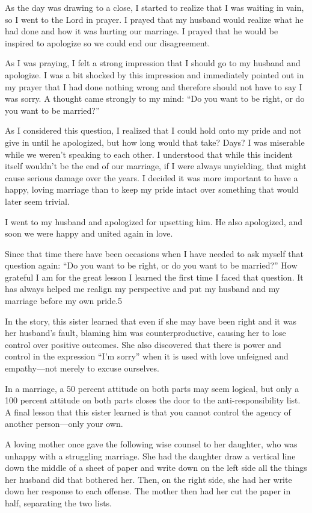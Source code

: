 \documentclass[letterpaper, 11pt]{report}
\begin{document}
As the day was drawing to a close, I started to realize that I was waiting in vain, so I went to the Lord in prayer. I prayed that my husband would realize what he had done and how it was hurting our marriage. I prayed that he would be inspired to apologize so we could end our disagreement.

As I was praying, I felt a strong impression that I should go to my husband and apologize. I was a bit shocked by this impression and immediately pointed out in my prayer that I had done nothing wrong and therefore should not have to say I was sorry. A thought came strongly to my mind: “Do you want to be right, or do you want to be married?”

As I considered this question, I realized that I could hold onto my pride and not give in until he apologized, but how long would that take? Days? I was miserable while we weren’t speaking to each other. I understood that while this incident itself wouldn’t be the end of our marriage, if I were always unyielding, that might cause serious damage over the years. I decided it was more important to have a happy, loving marriage than to keep my pride intact over something that would later seem trivial.

I went to my husband and apologized for upsetting him. He also apologized, and soon we were happy and united again in love.

Since that time there have been occasions when I have needed to ask myself that question again: “Do you want to be right, or do you want to be married?” How grateful I am for the great lesson I learned the first time I faced that question. It has always helped me realign my perspective and put my husband and my marriage before my own pride.5

In the story, this sister learned that even if she may have been right and it was her husband’s fault, blaming him was counterproductive, causing her to lose control over positive outcomes. She also discovered that there is power and control in the expression “I’m sorry” when it is used with love unfeigned and empathy—not merely to excuse ourselves.

In a marriage, a 50 percent attitude on both parts may seem logical, but only a 100 percent attitude on both parts closes the door to the anti-responsibility list. A final lesson that this sister learned is that you cannot control the agency of another person—only your own.

A loving mother once gave the following wise counsel to her daughter, who was unhappy with a struggling marriage. She had the daughter draw a vertical line down the middle of a sheet of paper and write down on the left side all the things her husband did that bothered her. Then, on the right side, she had her write down her response to each offense. The mother then had her cut the paper in half, separating the two lists.
\end{document}

